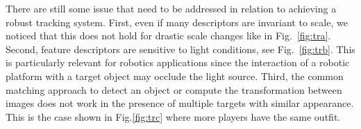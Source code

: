 There are still some issue that need to be addressed in relation to achieving a robust tracking system. First, even if many descriptors are invariant to scale, we noticed that this does
not hold for drastic scale changes like in Fig.~\ref{fig:tra}. Second, feature descriptors are sensitive to light conditions, see Fig.~\ref{fig:trb}. This is particularly relevant for robotics applications since the interaction of a robotic platform with a target object may occlude the light source. Third, the common matching approach to detect an object or compute the transformation between images \cite{mikolajczyk05} does not work in the presence of multiple targets with similar appearance. This is the case shown in Fig.\ref{fig:trc} where more players have the same outfit.










